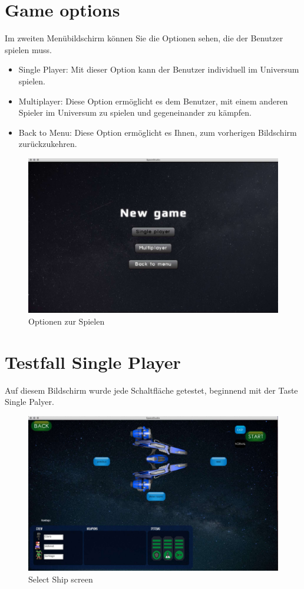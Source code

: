 \documentclass[12pt]{article}
\begin{document}
\section{Game options}
Im zweiten Menübildschirm können Sie die Optionen sehen, die der Benutzer spielen muss.
\begin{itemize}
\item Single Player: Mit dieser Option kann der Benutzer individuell im Universum spielen.
\item Multiplayer: Diese Option ermöglicht es dem Benutzer, mit einem anderen Spieler im Universum zu spielen und gegeneinander zu kämpfen.
\item Back to Menu: Diese Option ermöglicht es Ihnen, zum vorherigen Bildschirm zurückzukehren.
\end{itemize}
\begin{figure}[h]
\centering
\includegraphics[scale=0.4]{TestProtocolBilder/menuScreenTwo.jpg}
\caption{Optionen zur Spielen}
\end{figure}
\newpage
\section{Testfall Single Player}
Auf diesem Bildschirm wurde jede Schaltfläche getestet, beginnend mit der Taste Single Palyer.\\
\begin{figure}[h]
\centering
\includegraphics[scale=0.4]{TestProtocolBilder/selecShipScreen.jpg}
\caption{Select Ship screen}
\end{figure}
\newpage
\end{document}
